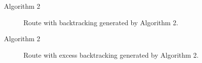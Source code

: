 \documentclass{beamer}
\begin{document}
\begin{frame}{Algorithm 2 \cite{lu2015arc}}
\begin{figure}
\caption{Route with backtracking generated by Algorithm 2.}
\end{figure}    
\end{frame}

\begin{frame}{Algorithm 2 \cite{lu2015arc}}
\begin{figure}
\caption{Route with excess backtracking generated by Algorithm 2.}
\end{figure}    
\end{frame}
\end{document}
